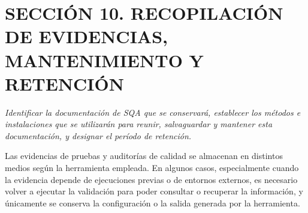 \section{SECCIÓN 10. RECOPILACIÓN DE EVIDENCIAS, MANTENIMIENTO Y RETENCIÓN}
\textit{Identificar la documentación de SQA que se conservará, establecer los métodos e instalaciones que se utilizarán para reunir, salvaguardar y mantener esta documentación, y designar el período de retención.}

Las evidencias de pruebas y auditorías de calidad se almacenan en distintos medios según la herramienta empleada. En algunos casos, especialmente cuando la evidencia depende de ejecuciones previas o de entornos externos, es necesario volver a ejecutar la validación para poder consultar o recuperar la información, y únicamente se conserva la configuración o la salida generada por la herramienta.

